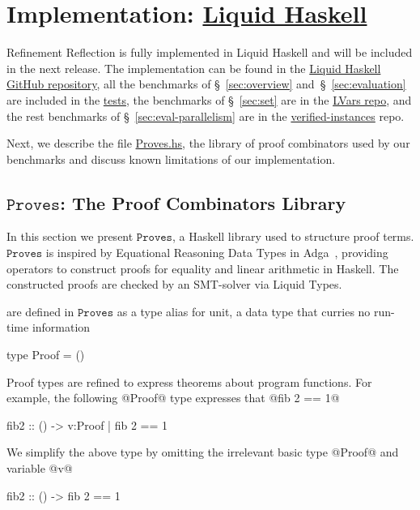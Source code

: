 \section{Implementation: \href{https://github.com/ucsd-progsys/liquidhaskell/tree/popl17}{Liquid Haskell}}

Refinement Reflection is fully implemented in
Liquid Haskell and will be included in the next release.
%
The implementation can be found in the
%
\href{https://git.io/vvARo}{Liquid Haskell GitHub repository},
%
all the benchmarks of \S~\ref{sec:overview} and~\S~\ref{sec:evaluation}
are included in the
%
\href{https://git.io/vXMKb}{tests},
the benchmarks of \S~\ref{sec:set}
are in the
\href{https://git.io/vXMKX}{LVars repo},
and the rest benchmarks of \S~\ref{sec:eval-parallelism}
are in the
\href{https://git.io/vXMKa}{verified-instances} repo.

%
Next, we describe the file
%
\href{https://github.com/ucsd-progsys/liquidhaskell/blob/pldi17/benchmarks/pldi17/pos/Proves.hs}{Proves.hs},
%
the library of proof combinators used by our benchmarks
and discuss known limitations of our implementation.


\renewcommand\libname{\ensuremath{\texttt{Proves}}\xspace}

\subsection{\libname: The Proof Combinators Library}
\label{subsec:library}

In this section we present \libname,
a Haskell library used to structure proof terms.
%
\libname is inspired by Equational Reasoning Data Types
in Adga~\citep{agdaequational}, providing operators to
construct proofs for equality and linear arithmetic in Haskell.
%
The constructed proofs are checked by an SMT-solver via Liquid Types.

 are defined in \libname as a type alias for unit,
a data type that curries no run-time information
%
\begin{code}
  type Proof = ()
\end{code}
%
Proof types are refined to express theorems about program functions.
%
For example, the following @Proof@ type expresses that
@fib 2 == 1@
%
\begin{code}
  fib2 :: () -> {v:Proof | fib 2 == 1}
\end{code}
%
We simplify the above type by omitting the irrelevant
basic type @Proof@ and variable @v@
%
\begin{code}
  fib2 :: () -> { fib 2 == 1 }
\end{code}
%

